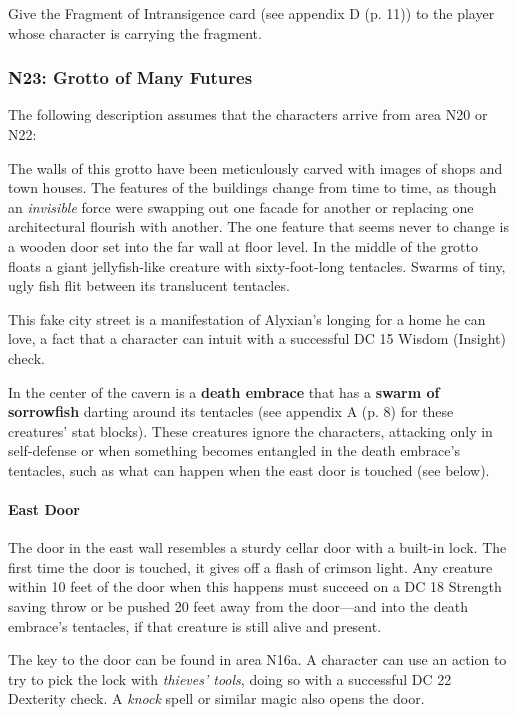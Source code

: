 \documentclass[letterpaper, 11pt, bg=full, twocolumn]{dndbook}
\begin{document}
Give the Fragment of Intransigence card (see appendix D (p. 11)) to the player whose character is carrying the fragment.

\subsubsection{N23: Grotto of Many Futures}

The following description assumes that the characters arrive from area N20 or N22:

\begin{DndReadAloud}
The walls of this grotto have been meticulously carved with images of shops and town houses. The features of the buildings change from time to time, as though an \textit{invisible} force were swapping out one facade for another or replacing one architectural flourish with another. The one feature that seems never to change is a wooden door set into the far wall at floor level.
In the middle of the grotto floats a giant jellyfish-like creature with sixty-foot-long tentacles. Swarms of tiny, ugly fish flit between its translucent tentacles.
\end{DndReadAloud}


This fake city street is a manifestation of Alyxian's longing for a home he can love, a fact that a character can intuit with a successful DC 15 Wisdom (Insight) check.

In the center of the cavern is a \textbf{death embrace} that has a \textbf{swarm of sorrowfish} darting around its tentacles (see appendix A (p. 8) for these creatures' stat blocks). These creatures ignore the characters, attacking only in self-defense or when something becomes entangled in the death embrace's tentacles, such as what can happen when the east door is touched (see below).

\paragraph{East Door}

The door in the east wall resembles a sturdy cellar door with a built-in lock. The first time the door is touched, it gives off a flash of crimson light. Any creature within 10 feet of the door when this happens must succeed on a DC 18 Strength saving throw or be pushed 20 feet away from the door---and into the death embrace's tentacles, if that creature is still alive and present.

The key to the door can be found in area N16a. A character can use an action to try to pick the lock with \textit{thieves' tools}, doing so with a successful DC 22 Dexterity check. A \textit{knock} spell or similar magic also opens the door.
\end{document}
